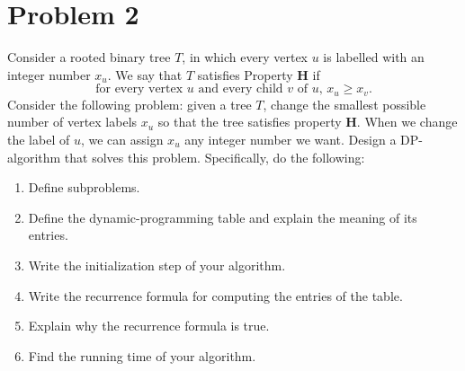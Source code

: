 \section{Problem 2}
Consider a rooted binary tree $T$, in which every vertex $u$ is labelled with an integer number $x_u$. We say that $T$ satisfies Property $\mathbf{H}$ if
\[\text{for every vertex $u$ and every child $v$ of $u$, $x_u \geq x_v$}.\]
Consider the following problem: given a tree $T$, change the smallest possible number of vertex labels $x_u$ so that the tree satisfies property $\mathbf{H}$. When we change the label of $u$, we can assign $x_u$ any integer number we want. Design a DP-algorithm that solves this problem. Specifically, do the following:
\begin{enumerate}
    \item Define subproblems.
    \item Define the dynamic-programming table and explain the meaning of its entries.
    \item Write the initialization step of your algorithm.
    \item Write the recurrence formula for computing the entries of the table. 
    \item Explain why the recurrence formula is true.
    \item Find the running time of your algorithm.
\end{enumerate}
\partbreak
